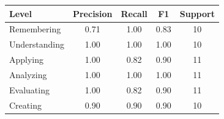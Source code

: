 \begin{tabular}{lcccc}
\hline
Level & Precision & Recall & F1 & Support \\
\hline
Remembering & 0.71 & 1.00 & 0.83 & 10 \\
Understanding & 1.00 & 1.00 & 1.00 & 10 \\
Applying & 1.00 & 0.82 & 0.90 & 11 \\
Analyzing & 1.00 & 1.00 & 1.00 & 11 \\
Evaluating & 1.00 & 0.82 & 0.90 & 11 \\
Creating & 0.90 & 0.90 & 0.90 & 10 \\
\hline
\end{tabular}